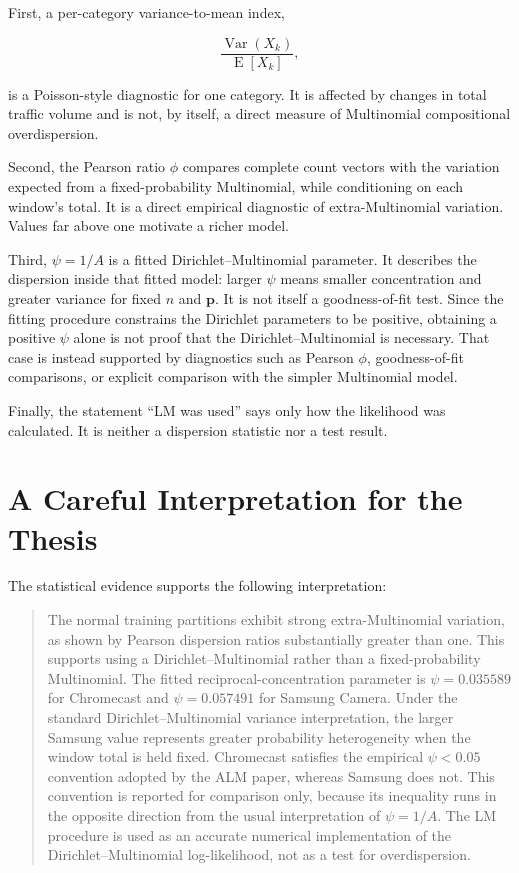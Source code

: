 \documentclass[11pt,a4paper]{article}
\begin{document}
First, a per-category variance-to-mean index,

\[
\frac{\operatorname{Var}(X_k)}{\operatorname{E}[X_k]},
\]

is a Poisson-style diagnostic for one category.  It is affected by changes in
total traffic volume and is not, by itself, a direct measure of Multinomial
compositional overdispersion.

Second, the Pearson ratio $\phi$ compares complete count vectors with the
variation expected from a fixed-probability Multinomial, while conditioning on
each window's total.  It is a direct empirical diagnostic of
extra-Multinomial variation.  Values far above one motivate a richer model.

Third, $\psi=1/A$ is a fitted Dirichlet--Multinomial parameter.  It describes
the dispersion inside that fitted model: larger $\psi$ means smaller
concentration and greater variance for fixed $n$ and $\mathbf{p}$.  It is not
itself a goodness-of-fit test.  Since the fitting procedure constrains the
Dirichlet parameters to be positive, obtaining a positive $\psi$ alone is not
proof that the Dirichlet--Multinomial is necessary.  That case is instead
supported by diagnostics such as Pearson $\phi$, goodness-of-fit comparisons,
or explicit comparison with the simpler Multinomial model.

Finally, the statement ``LM was used'' says only how the likelihood was
calculated.  It is neither a dispersion statistic nor a test result.

\section{A Careful Interpretation for the Thesis}

The statistical evidence supports the following interpretation:

\begin{quote}
The normal training partitions exhibit strong extra-Multinomial variation, as
shown by Pearson dispersion ratios substantially greater than one.  This
supports using a Dirichlet--Multinomial rather than a fixed-probability
Multinomial.  The fitted reciprocal-concentration parameter is
$\psi=0.035589$ for Chromecast and $\psi=0.057491$ for Samsung Camera.  Under
the standard Dirichlet--Multinomial variance interpretation, the larger
Samsung value represents greater probability heterogeneity when the window
total is held fixed.  Chromecast satisfies the empirical $\psi<0.05$
convention adopted by the ALM paper, whereas Samsung does not.  This
convention is reported for comparison only, because its inequality runs in the
opposite direction from the usual interpretation of $\psi=1/A$.  The LM
procedure is used as an accurate numerical implementation of the
Dirichlet--Multinomial log-likelihood, not as a test for overdispersion.
\end{quote}
\end{document}
